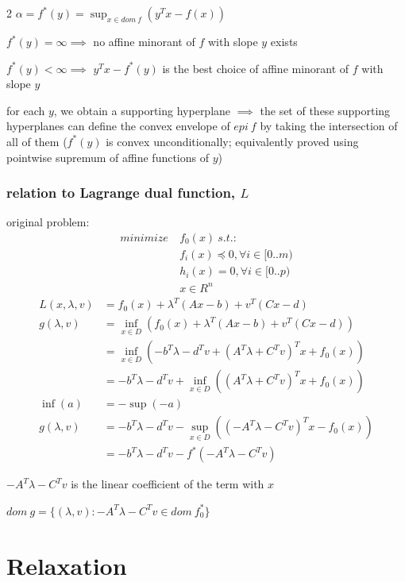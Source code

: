 \documentclass[8pt]{extarticle}
\begin{document}
\begin{multicols*}{2}
  $\alpha = f^*(y) = \sup_{x \in dom\ f}(y^T x - f(x))$

  $f^*(y) = \infty \implies$ no affine minorant of $f$ with slope $y$ exists
  
  $f^*(y) < \infty \implies$ $y^T x - f^*(y)$ is the best choice of affine minorant of $f$ with slope $y$

  for each $y$, we obtain a supporting hyperplane $\implies$ the set of these supporting hyperplanes can define the convex envelope of $epi\ f$ by taking the intersection of all of them ($f^*(y)$ is convex unconditionally; equivalently proved using pointwise supremum of affine functions of $y$)
  
  \subsubsection{relation to Lagrange dual function, $L$}

  original problem:
  \begin{align*}
    minimize\ &f_0(x)\ s.t.:\\
    &f_i(x) \preceq 0, \forall i \in [0..m)\\
    &h_i(x) = 0, \forall i \in [0..p)\\
    &x \in R^n
  \end{align*}
  \begin{align*}
    L(x, \lambda, v) &= f_0(x) + \lambda^T(Ax-b) + v^T(Cx-d)\\
    g(\lambda, v) &= \inf_{x \in D}(f_0(x) + \lambda^T(Ax-b) + v^T(Cx-d))\\
                    &= \inf_{x \in D}(-b^T \lambda -d^T v + (A^T\lambda + C^Tv)^T x + f_0(x))\\
                    &= -b^T \lambda -d^T v + \inf_{x \in D}((A^T\lambda + C^Tv)^T x + f_0(x))\\
    \inf(a) &= - \sup(-a)\\
    g(\lambda, v) &= -b^T \lambda -d^T v -\sup_{x \in D}((-A^T\lambda - C^Tv)^T x - f_0(x))\\
                    &= -b^T \lambda -d^T v - f^*(-A^T\lambda - C^Tv)
  \end{align*}

  $-A^T\lambda - C^Tv$ is the linear coefficient of the term with $x$
  
  $dom\ g = \{ (\lambda, v): -A^T\lambda - C^Tv \in dom\ f_0^* \}$
  
  \vfill\null
  \columnbreak
  
  \section{Relaxation}


\end{multicols*}
\end{document}
